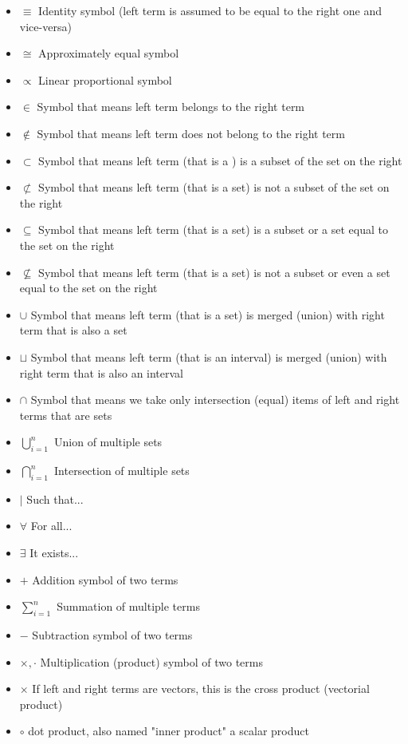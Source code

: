 \documentclass[12pt,a4paper,twoside,openright]{report}
\theoremstyle{definition}
\theoremstyle{itexmp}
\numberwithin{equation}{section}
\begin{document}
\begin{itemize}[label={},leftmargin=0.5cm]
	 	\item $\equiv$ Identity symbol (left term is assumed to be equal to the right one and vice-versa)
	 	\item $\cong$ Approximately equal symbol
	 	\item $\propto$ Linear proportional symbol 
	 	\item $\in$ Symbol that means left term belongs to the right term
	 	\item $\not\in$ Symbol that means left term does not belong to the right term
	 	\item $\subset$ Symbol that means left term (that is a ) is a subset of the set on the right 
	 	\item $\not\subset$ Symbol that means left term (that is a set) is not a subset of the set on the right
	 	\item $\subseteq$ Symbol that means left term (that is a set) is a subset or a set equal to the set on the right
	 	\item $\not\subseteq$ Symbol that means left term (that is a set) is not a subset or even a set equal to the set on the right
	 	\item $\cup$ Symbol that means left term (that is a set) is merged (union) with right term that is also a set
	 	\item $\sqcup$ Symbol that means left term (that is an interval) is merged (union) with right term that is also an interval
	 	\item $\cap$ Symbol that means we take only intersection (equal) items of left and right terms that are sets
	 	\item $\displaystyle \bigcup_{i=1}^n$ Union of multiple sets
	 	\item $\displaystyle \bigcap_{i=1}^n$ Intersection of multiple sets
	 	\item $\mid$ Such that...
	 	\item $\forall$ For all...
	 	\item $\exists$ It exists...
	 	\item $+$ Addition symbol of two terms
	 	\item $\displaystyle \sum_{i=1}^n$ Summation of multiple terms
	 	\item $-$ Subtraction symbol of two terms
	 	\item $\times, \cdot$ Multiplication (product) symbol of two terms
	 	\item $\times$ If left and right terms are vectors, this is the cross product (vectorial product)
	 	\item $\circ$ dot product, also named "inner product" a scalar product

\end{itemize}
\end{document}
